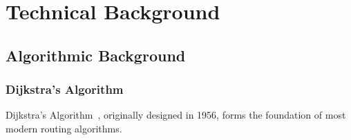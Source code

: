 \documentclass[ %
                    author={Alexander Hill},
                supervisor={Dr. Benjamin Sach},
                    degree={MEng},
                     title={MARMOSET: Multi Agent Real-time Multi-core Online
                     Simulation for Efficient Transportation},
                  subtitle={},
                      type={research},
                      year={2016} ]{dissertation}
\begin{document}




\chapter{Technical Background}
\label{chap:technical}


\section{Algorithmic Background}

\subsection{Dijkstra's Algorithm}

Dijkstra's Algorithm~\cite{dijkstra}, originally designed in 1956, forms the
foundation of most modern routing algorithms.
\end{document}
